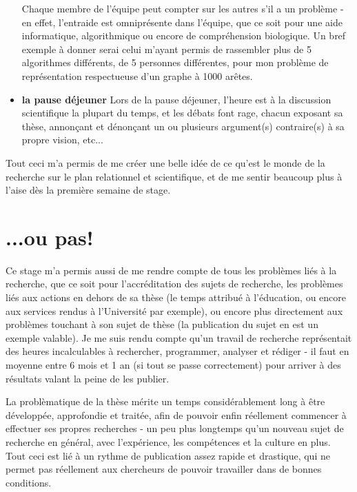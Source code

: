 \documentclass[pdftex,12pt,a4paper]{report}
\begin{document}
\begin{spacing}{1.2}
\begin{itemize}
	\newline
	Chaque membre de l'équipe peut compter sur les autres s'il a un problème - en effet, l'entraide est omniprésente dans l'équipe, que ce soit pour une aide informatique, algorithmique ou encore de compréhension biologique. Un bref exemple à donner serai celui m'ayant permis de rassembler plus de 5 algorithmes différents, de 5 personnes différentes, pour mon problème de représentation respectueuse d'un graphe à 1000 arêtes.
\item \textbf{la pause déjeuner}
	\newline
	Lors de la pause déjeuner, l'heure est à la discussion scientifique la plupart du temps, et les débats font rage, chacun exposant sa thèse, annonçant et dénonçant un ou plusieurs argument(s) contraire(s) à sa propre vision, etc...
\end{itemize}
Tout ceci m'a permis de me créer une belle idée de ce qu'est le monde de la recherche sur le plan relationnel et scientifique, et de me sentir beaucoup plus à l'aise dès la première semaine de stage.

\section{...ou pas!}

Ce stage m'a permis aussi de me rendre compte de tous les problèmes liés à la recherche, que ce soit pour l'accréditation des sujets de recherche, les problèmes liés aux actions en dehors de sa thèse (le temps attribué à l'éducation, ou encore aux services rendus à l'Université par exemple), ou encore plus directement aux problèmes touchant à son sujet de thèse (la publication du sujet en est un exemple valable).
\newline
Je me suis rendu compte qu'un travail de recherche représentait des heures incalculables à rechercher, programmer, analyser et rédiger - il faut en moyenne entre 6 mois et 1 an (si tout se passe correctement) pour arriver à des résultats valant la peine de les publier.

La problèmatique de la thèse mérite un temps considérablement long à être développée, approfondie et traitée, afin de pouvoir enfin réellement commencer à effectuer ses propres recherches - un peu plus longtemps qu'un nouveau sujet de recherche en général, avec l'expérience, les compétences et la culture en plus.
\newline
Tout ceci est lié à un rythme de publication assez rapide et drastique, qui ne permet pas réellement aux chercheurs de pouvoir travailler dans de bonnes conditions.


\end{spacing}
\end{document}
